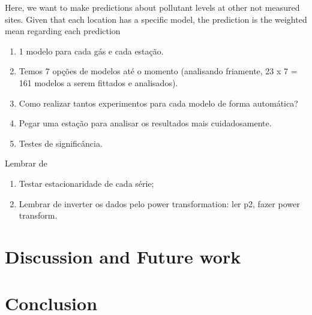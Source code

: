 Here, we want to make predictions about pollutant levels at other not measured
sites. Given that each location has a specific model, the prediction
is the weighted mean regarding each prediction 



\begin{enumerate}
    \item 1 modelo para cada gás e cada estação. 
    \item Temos 7 opções de modelos até o momento (analisando friamente, 23 x
    7 = 161 modelos a serem fittados e analisados). 
    \item Como realizar tantos experimentos para cada modelo de forma
    automática? 
    \item Pegar uma estação para analisar os resultados mais cuidadosamente. 
    \item Testes de significância.  
\end{enumerate}

Lembrar de 

\begin{enumerate}
    \item Testar estacionaridade de cada série; 
    \item Lembrar de inverter os dados pelo power transformation: ler p2, fazer power transform. 
\end{enumerate}



\section{Discussion and Future work}
\label{sec:discussion}


\section{Conclusion}
\label{sec:conclusion}
